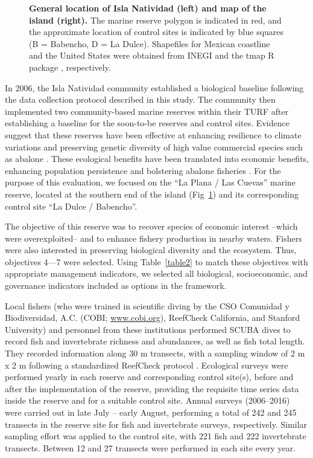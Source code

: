 \documentclass[10pt,letterpaper]{article}
\begin{document}
\clearpage

\begin{figure}[!h]
\caption{{\bf General location of Isla Natividad (left) and map of the island (right).}
The marine reserve polygon is indicated in red, and the approximate location of control sites is indicated by blue squares (B = Babencho, D = La Dulce). Shapefiles for Mexican coastline and the United States were obtained from INEGI \cite{INEGI} and the tmap R package \cite{tmap_2017}, respectively.}
\label{fig3}
\end{figure}

In 2006, the Isla Natividad community established a biological baseline following the data collection protocol described in this study. The community then implemented two community-based marine reserves within their TURF \cite{afflerbach_2014-HP,lester_2017-nh,micheli_2012-EU} after establishing a baseline for the soon-to-be reserves and control sites. Evidence suggest that these reserves have been effective at enhancing resilience to climate variations \cite{micheli_2012-EU} and preserving genetic diversity of high value commercial species such as abalone \cite{munguavega_2015-yg}. These ecological benefits have been translated into economic benefits, enhancing population persistence and bolstering abalone fisheries \cite{rossetto_2015-V0}. For the purpose of this evaluation, we focused on the ``La Plana / Las Cuevas'' marine reserve, located at the southern end of the island (Fig~\ref{fig3}) and its corresponding control site ``La Dulce / Babencho''.

The objective of this reserve was to recover species of economic interest --which were overexploited-- and to enhance fishery production in nearby waters. Fishers were also interested in preserving biological diversity and the ecosystem. Thus, objectives 4---7 were selected. Using Table~\ref{table2} to match these objectives with appropriate management indicators, we selected all biological, socioeconomic, and governance indicators included as options in the framework.

Local fishers (who were trained in scientific diving by the CSO Comunidad y Biodiversidad, A.C. (COBI; \url{www.cobi.org}), ReefCheck California, and Stanford University) and personnel from these institutions performed SCUBA dives to record fish and invertebrate richness and abundances, as well as fish total length. They recorded information along 30 m transects, with a sampling window of 2 m x 2 m following a standardized ReefCheck protocol \cite{suman_2010-ez}. Ecological surveys were performed yearly in each reserve and corresponding control site(s), before and after the implementation of the reserve, providing the requisite time series data inside the reserve and for a suitable control site. Annual surveys (2006--2016) were carried out in late July -- early August, performing a total of 242 and 245 transects in the reserve site for fish and invertebrate surveys, respectively. Similar sampling effort was applied to the control site, with 221 fish and 222 invertebrate transects. Between 12 and 27 transects were performed in each site every year.
\end{document}
